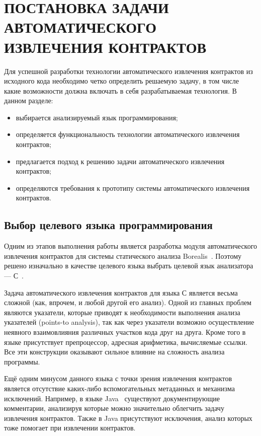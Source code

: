 \chapter{ПОСТАНОВКА ЗАДАЧИ АВТОМАТИЧЕСКОГО ИЗВЛЕЧЕНИЯ КОНТРАКТОВ}
\label{chapter:task}
Для успешной разработки технологии автоматического извлечения контрактов из исходного кода необходимо четко определить решаемую задачу, в том числе какие возможности должна включать в себя разрабатываемая технология. В данном разделе:
\begin{itemize}
\item выбирается анализируемый язык программирования;
\item определяется функциональность технологии автоматического извлечения контрактов;
\item предлагается подход к решению задачи автоматического извлечения контрактов;
\item определяются требования к прототипу системы автоматического извлечения контрактов.
\end{itemize}

\section{Выбор целевого языка программирования}
Одним из этапов выполнения работы является разработка модуля автоматического извлечения контрактов для системы статического анализа Borealis~\cite{borealis}. Поэтому решено изначально в качестве целевого языка выбрать целевой язык анализатора --- С~\cite{languageC}.

Задача автоматического извлечения контрактов для языка С является весьма сложной (как, впрочем, и любой другой его анализ). Одной из главных проблем являются указатели, которые приводят к необходимости выполнения анализа указателей (points-to analysis), так как через указатели возможно осуществление неявного взаимовлияния различных участков кода друг на друга. Кроме того в языке присутствует препроцессор, адресная арифметика, вычисляемые ссылки. Все эти конструкции оказывают сильное влияние на сложность анализа программы.

Ещё одним минусом данного языка с точки зрения извлечения контрактов является отсутствие каких-либо вспомогательных метаданных и механизма исключений. Например, в языке Java~\cite{languageJava} существуют документирующие комментарии, анализируя которые можно значительно облегчить задачу извлечения контрактов. Также в Java присутствуют исключения, анализ которых тоже помогает при извлечении контрактов.

